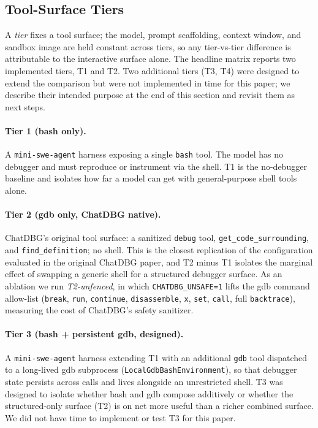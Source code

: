 \documentclass[11pt]{article}
\begin{document}
\subsection{Tool-Surface Tiers}
\label{sec:methods:tiers}

A \emph{tier} fixes a tool surface; the model, prompt scaffolding, context window, and sandbox image are held constant across tiers, so any tier-vs-tier difference is attributable to the interactive surface alone. The headline matrix reports two implemented tiers, T1 and T2. Two additional tiers (T3, T4) were designed to extend the comparison but were not implemented in time for this paper; we describe their intended purpose at the end of this section and revisit them as next steps.

\paragraph{Tier 1 (bash only).} A \texttt{mini-swe-agent} harness \citep{minisweagent2025} exposing a single \texttt{bash} tool. The model has no debugger and must reproduce or instrument via the shell. T1 is the no-debugger baseline and isolates how far a model can get with general-purpose shell tools alone.

\paragraph{Tier 2 (gdb only, ChatDBG native).} ChatDBG's original tool surface: a sanitized \texttt{debug} tool, \texttt{get\_code\_surrounding}, and \texttt{find\_definition}; no shell. This is the closest replication of the configuration evaluated in the original ChatDBG paper, and T2 minus T1 isolates the marginal effect of swapping a generic shell for a structured debugger surface. As an ablation we run \emph{T2-unfenced}, in which \texttt{CHATDBG\_UNSAFE=1} lifts the gdb command allow-list (\texttt{break}, \texttt{run}, \texttt{continue}, \texttt{disassemble}, \texttt{x}, \texttt{set}, \texttt{call}, full \texttt{backtrace}), measuring the cost of ChatDBG's safety sanitizer.

\paragraph{Tier 3 (bash + persistent gdb, designed).} A \texttt{mini-swe-agent} harness extending T1 with an additional \texttt{gdb} tool dispatched to a long-lived gdb subprocess (\texttt{LocalGdbBashEnvironment}), so that debugger state persists across calls and lives alongside an unrestricted shell. T3 was designed to isolate whether bash and gdb compose additively or whether the structured-only surface (T2) is on net more useful than a richer combined surface. We did not have time to implement or test T3 for this paper.
\end{document}
